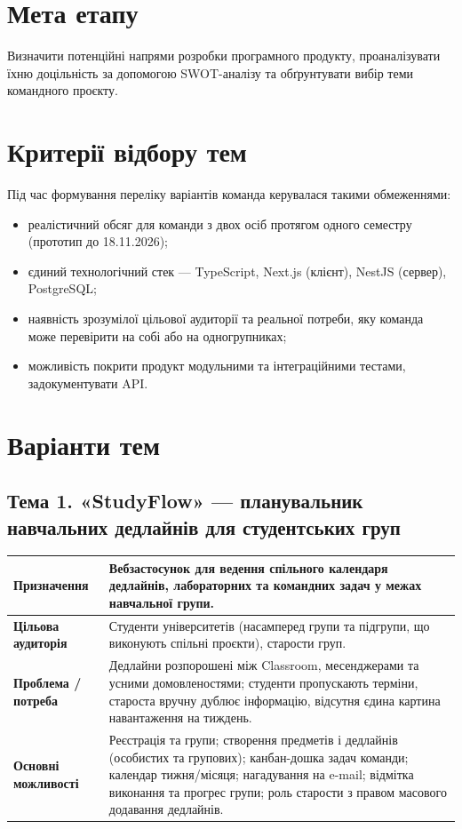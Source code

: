 \documentclass[12pt]{article}
\begin{document}

\section{Мета етапу}
Визначити потенційні напрями розробки програмного продукту, проаналізувати їхню доцільність за допомогою SWOT-аналізу та обґрунтувати вибір теми командного проєкту.

\section{Критерії відбору тем}
Під час формування переліку варіантів команда керувалася такими обмеженнями:
\begin{itemize}[leftmargin=1.5em,nosep]
  \item реалістичний обсяг для команди з двох осіб протягом одного семестру (прототип до 18.11.2026);
  \item єдиний технологічний стек --- TypeScript, Next.js (клієнт), NestJS (сервер), PostgreSQL;
  \item наявність зрозумілої цільової аудиторії та реальної потреби, яку команда може перевірити на собі або на одногрупниках;
  \item можливість покрити продукт модульними та інтеграційними тестами, задокументувати API.
\end{itemize}

\section{Варіанти тем}

\subsection{Тема 1. «StudyFlow» --- планувальник навчальних дедлайнів для студентських груп}
\begin{tabularx}{\textwidth}{L{3.6cm} Y}
\toprule
\textbf{Призначення} & Вебзастосунок для ведення спільного календаря дедлайнів, лабораторних та командних задач у межах навчальної групи.\\
\midrule
\textbf{Цільова аудиторія} & Студенти університетів (насамперед групи та підгрупи, що виконують спільні проєкти), старости груп.\\
\midrule
\textbf{Проблема / потреба} & Дедлайни розпорошені між Classroom, месенджерами та усними домовленостями; студенти пропускають терміни, староста вручну дублює інформацію, відсутня єдина картина навантаження на тиждень.\\
\midrule
\textbf{Основні можливості} & Реєстрація та групи; створення предметів і дедлайнів (особистих та групових); канбан-дошка задач команди; календар тижня/місяця; нагадування на e-mail; відмітка виконання та прогрес групи; роль старости з правом масового додавання дедлайнів.\\
\bottomrule
\end{tabularx}
\end{document}

